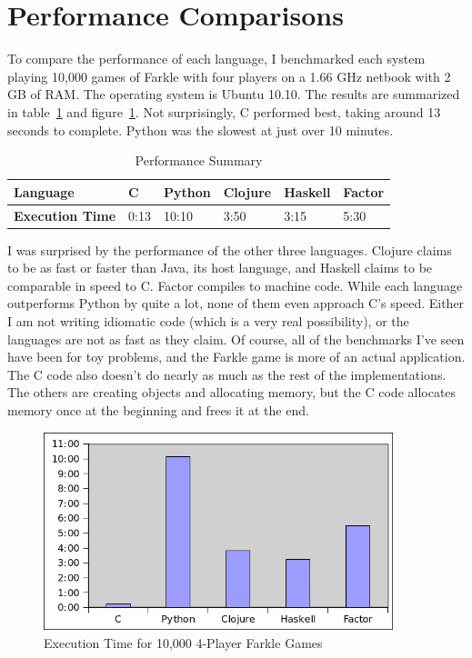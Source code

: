 \documentclass{article}
\begin{document}
\section{Performance Comparisons}

To compare the performance of each language, I benchmarked each system playing
10,000 games of Farkle with four players on a 1.66 GHz netbook with 2 GB of RAM.
The operating system is Ubuntu 10.10.  The results are summarized in
table~\ref{tab:performance} and figure~\ref{fig:performance}.  Not surprisingly,
C performed best, taking around 13 seconds to complete.  Python was the slowest
at just over 10 minutes.

\begin{table}[h]
    \caption{Performance Summary \label{tab:performance}}
    \begin{tabular}{|p{1.2in}|p{0.3in}|p{0.5in}|p{0.5in}|p{0.5in}|p{0.5in}|}
        \hline
        {\bf Language} & {\bf C} & {\bf Python} & {\bf Clojure} & {\bf Haskell} & {\bf Factor} \\
        \hline
        {\bf Execution Time} & 0:13 & 10:10 & 3:50 & 3:15 & 5:30 \\
        \hline
    \end{tabular}
\end{table}

I was surprised by the performance of the other three languages.  Clojure claims
to be as fast or faster than Java, its host language, and Haskell claims to be
comparable in speed to C.  Factor compiles to machine code.  While each language
outperforms Python by quite a lot, none of them even approach C's speed.  Either
I am not writing idiomatic code (which is a very real possibility), or the
languages are not as fast as they claim.  Of course, all of the benchmarks I've
seen have been for toy problems, and the Farkle game is more of an actual
application.  The C code also doesn't do nearly as much as the rest of the
implementations.  The others are creating objects and allocating memory, but the
C code allocates memory once at the beginning and frees it at the end.

\begin{figure}[h]
    \centering
    \includegraphics[width=4in]{graphs/performance-comparison.png}
    \caption{Execution Time for 10,000 4-Player Farkle Games \label{fig:performance}}
\end{figure}
\end{document}
